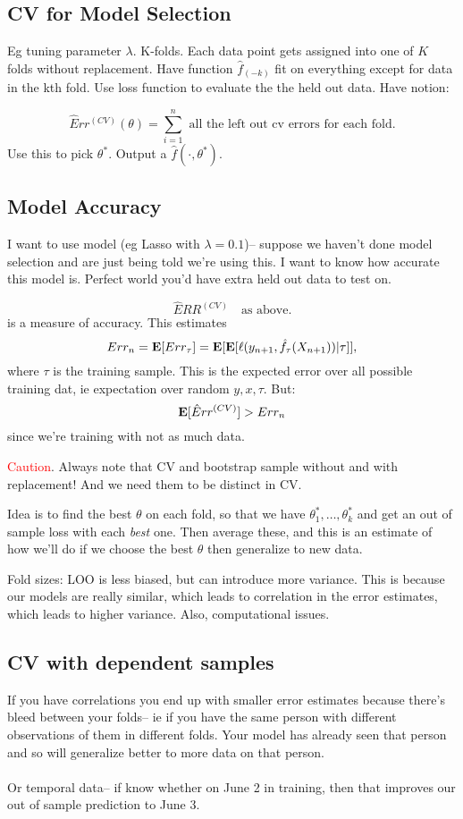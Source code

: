 \documentclass{article}
\newcommand\myworries[1]{\textcolor{red}{#1}}
\begin{document}
\subsection{CV for Model Selection}
Eg tuning parameter $\lambda$. K-folds. Each data point gets assigned into one of $K$ folds without replacement. Have function $\hat f_{(-k)}$ fit on everything except for data in the kth fold. Use loss function to evaluate the the held out data. Have notion:

$$\hat Err ^{(CV)} (\theta) = \sum_{i=1}^n \text{ all the left out cv errors for each fold}.$$
Use this to pick $\theta^*$. Output a $\hat f(\cdot , \theta^*)$. 

\subsection{Model Accuracy}
I want to use model (eg Lasso with $\lambda = 0.1$)-- suppose we haven't done model selection and are just being told we're using this. I want to know how accurate this model is. Perfect world you'd have extra held out data to test on. 

$$\hat ERR^{(CV)} \quad \text{as above}.$$
is a measure of accuracy. This estimates 
$$Err_n = \mathbf{E} [Err_\tau] = \mathbf{E} [\mathbf{E} [\ell(y_{n+1}, \hat f_\tau (X_{n+1})) | \tau]],$$
where $\tau$ is the training sample. This is the expected error over all possible training dat, ie expectation over random $y,x, \tau$.
But:
$$\mathbf{E}[\hat Err^{(CV)}] > Err_n$$ 
since we're training with not as much data. 

\myworries{Caution}. Always note that CV and bootstrap sample without and with replacement! And we need them to be distinct in CV. 
\begin{definition}[Nested CV]
Idea is to find the best $\theta$ on each fold, so that we have $\theta_1^*,\ldots, \theta_k^*$ and get an out of sample loss with each \textit{best} one. Then average these, and this is an estimate of how we'll do if we choose the best $\theta$ then generalize to new data. 
\end{definition}

Fold sizes: LOO is less biased, but can introduce more variance. This is because our models are really similar, which leads to correlation in the error estimates, which leads to higher variance. Also, computational issues.

\subsection{CV with dependent samples}
If you have correlations you end up with smaller error estimates because there's bleed between your folds-- ie if you have the same person with different observations of them in different folds. Your model has already seen that person and so will generalize better to more data on that person. \\\\
Or temporal data-- if know whether on June 2 in training, then that improves our out of sample prediction to June 3. \\\\
\end{document}
